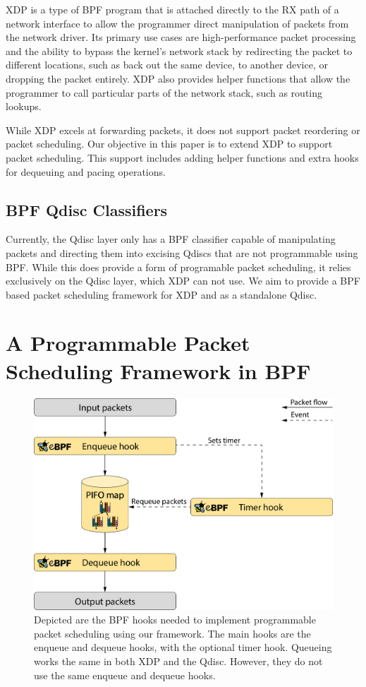 \documentclass[sigconf, nonacm]{acmart}
\begin{document}
XDP\cite{hoiland2018express} is a type of BPF program that is attached directly to the RX path of a network interface to allow the programmer direct manipulation of packets from the network driver. Its primary use cases are high-performance packet processing and the ability to bypass the kernel's network stack by redirecting the packet to different locations, such as back out the same device, to another device, or dropping the packet entirely. XDP also provides helper functions that allow the programmer to call particular parts of the network stack, such as routing lookups.

While XDP excels at forwarding packets, it does not support packet reordering or packet scheduling. Our objective in this paper is to extend XDP to support packet scheduling. This support includes adding helper functions and extra hooks for dequeuing and pacing operations.


\subsection{BPF Qdisc Classifiers}

Currently, the Qdisc layer only has a BPF classifier capable of manipulating packets and directing them into excising Qdiscs that are not programmable using BPF. While this does provide a form of programable packet scheduling, it relies exclusively on the Qdisc layer, which XDP can not use. We aim to provide a BPF based packet scheduling framework for XDP and as a standalone Qdisc.


\section{A Programmable Packet Scheduling Framework in BPF}

\begin{figure}

  \includegraphics[width=\linewidth]{bpf_pps_flow.pdf}

  \caption{Depicted are the BPF hooks needed to implement programmable packet scheduling using our framework. The main hooks are the enqueue and dequeue hooks, with the optional timer hook. Queueing works the same in both XDP and the Qdisc. However, they do not use the same enqueue and dequeue hooks.}
  \label{fig:bpf_pps_flow}
\end{figure}
\end{document}
